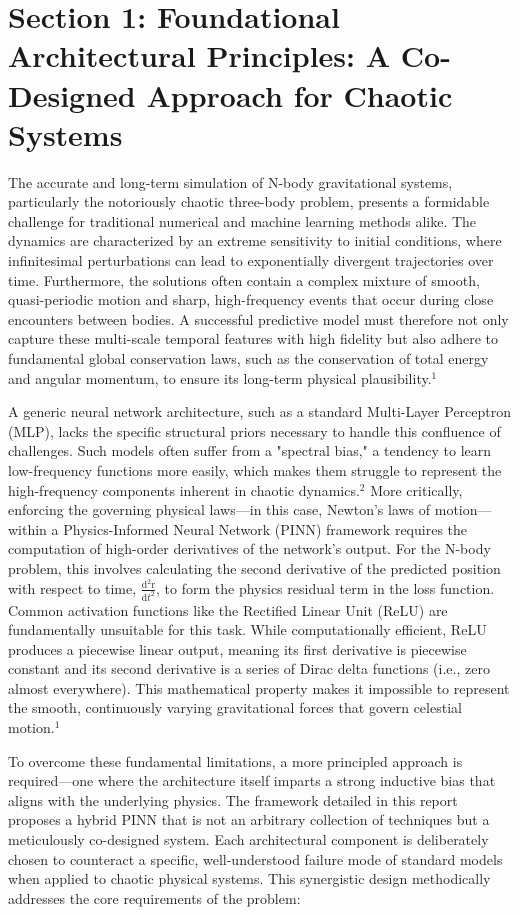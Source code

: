 \section{Section 1: Foundational Architectural Principles: A Co-Designed Approach for Chaotic Systems}

The accurate and long-term simulation of $\mathrm{N}$-body gravitational systems, particularly the notoriously chaotic three-body problem, presents a formidable challenge for traditional numerical and machine learning methods alike. The dynamics are characterized by an extreme sensitivity to initial conditions, where infinitesimal perturbations can lead to exponentially divergent trajectories over time. Furthermore, the solutions often contain a complex mixture of smooth, quasi-periodic motion and sharp, high-frequency events that occur during close encounters between bodies. A successful predictive model must therefore not only capture these multi-scale temporal features with high fidelity but also adhere to fundamental global conservation laws, such as the conservation of total energy and angular momentum, to ensure its long-term physical plausibility.$^1$

A generic neural network architecture, such as a standard Multi-Layer Perceptron (MLP), lacks the specific structural priors necessary to handle this confluence of challenges. Such models often suffer from a "spectral bias," a tendency to learn low-frequency functions more easily, which makes them struggle to represent the high-frequency components inherent in chaotic dynamics.$^2$ More critically, enforcing the governing physical laws—in this case, Newton's laws of motion—within a Physics-Informed Neural Network (PINN) framework requires the computation of high-order derivatives of the network's output. For the $\mathrm{N}$-body problem, this involves calculating the second derivative of the predicted position with respect to time, $\frac{\mathrm{d}^2 \mathrm{r}}{\mathrm{d} t^2}$, to form the physics residual term in the loss function. Common activation functions like the Rectified Linear Unit (ReLU) are fundamentally unsuitable for this task. While computationally efficient, ReLU produces a piecewise linear output, meaning its first derivative is piecewise constant and its second derivative is a series of Dirac delta functions (i.e., zero almost everywhere). This mathematical property makes it impossible to represent the smooth, continuously varying gravitational forces that govern celestial motion.$^1$

To overcome these fundamental limitations, a more principled approach is required—one where the architecture itself imparts a strong inductive bias that aligns with the underlying physics. The framework detailed in this report proposes a hybrid PINN that is not an arbitrary collection of techniques but a meticulously co-designed system. Each architectural component is deliberately chosen to counteract a specific, well-understood failure mode of standard models when applied to chaotic physical systems. This synergistic design methodically addresses the core requirements of the problem:

